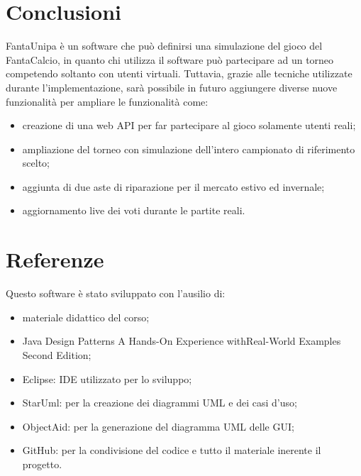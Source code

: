 \documentclass[12pt,a4paper]{article}
\begin{document}
\section{Conclusioni}
FantaUnipa è un software che può definirsi una simulazione del gioco del FantaCalcio, in quanto chi utilizza il software può partecipare ad un torneo competendo soltanto con utenti virtuali. Tuttavia, grazie alle tecniche utilizzate durante l'implementazione, sarà possibile in futuro aggiungere diverse nuove funzionalità per ampliare le funzionalità come:
\begin{itemize}
\item creazione di una web API per far partecipare al gioco solamente utenti reali;
\item ampliazione del torneo con simulazione dell'intero campionato di riferimento scelto;
\item aggiunta di due aste di riparazione per il mercato estivo ed invernale;
\item aggiornamento live dei voti durante le partite reali.
\end{itemize}
\section{Referenze}
Questo software è stato sviluppato con l'ausilio di:
\begin{itemize}
\item materiale didattico del corso;
\item Java Design Patterns A Hands-On Experience withReal-World Examples Second Edition;
\item Eclipse: IDE utilizzato per lo sviluppo;
\item StarUml: per la creazione dei diagrammi UML e dei casi d'uso;
\item ObjectAid: per la generazione del diagramma UML delle GUI;
\item GitHub: per la condivisione del codice e tutto il materiale inerente il progetto.
\end{itemize}
\end{document}
